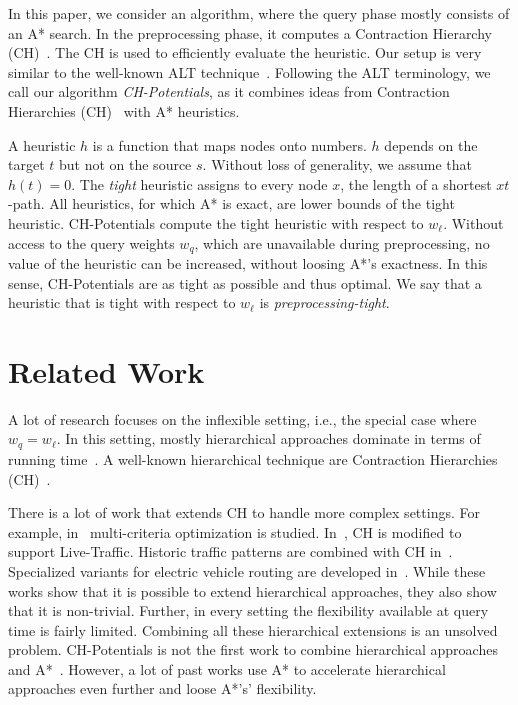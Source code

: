 \documentclass[a4paper,USenglish,cleveref, autoref, thm-restate]{lipics-v2019}
\begin{document}
In this paper, we consider an algorithm, where the query phase mostly consists of an A* search.
In the preprocessing phase, it computes a Contraction Hierarchy (CH)~\cite{gssv-erlrn-12}.
The CH is used to efficiently evaluate the heuristic.
Our setup is very similar to the well-known ALT technique~\cite{gh-cspas-05,DBLP:conf/wea/DellingW07}.
Following the ALT terminology, we call our algorithm \emph{CH-Potentials}, as it combines ideas from Contraction Hierarchies (CH)~\cite{gssv-erlrn-12} with A* heuristics.

A heuristic $h$ is a function that maps nodes onto numbers.
$h$ depends on the target $t$ but not on the source $s$.
Without loss of generality, we assume that $h(t)=0$.
The \emph{tight} heuristic assigns to every node $x$, the length of a shortest $xt$-path.
All heuristics, for which A* is exact, are lower bounds of the tight heuristic.
CH-Potentials compute the tight heuristic with respect to $w_\ell$.
Without access to the query weights $w_q$, which are unavailable during preprocessing, no value of the heuristic can be increased, without loosing A*'s exactness.
In this sense, CH-Potentials are as tight as possible and thus optimal.
We say that a heuristic that is tight with respect to $w_\ell$ is \emph{preprocessing-tight}.

\section{Related Work}

A lot of research focuses on the inflexible setting, i.e., the special case where $w_q = w_\ell$.
In this setting, mostly hierarchical approaches dominate in terms of running time~\cite{bdgmpsww-rptn-16}.
A well-known hierarchical technique are Contraction Hierarchies (CH)~\cite{gssv-erlrn-12}.

There is a lot of work that extends CH to handle more complex settings.
For example, in~\cite{fns-opca-14,gks-rpfof-10} multi-criteria optimization is studied.
In~\cite{dsw-cch-15}, CH is modified to support Live-Traffic.
Historic traffic patterns are combined with CH in~\cite{swz-sfert-19,bgsv-mtdtt-13,bdpw-dtdrp-16}.
Specialized variants for electric vehicle routing are developed in~\cite{DBLP:journals/algorithmica/BaumDPSWZ20,DBLP:conf/aaai/EisnerFS11}.
While these works show that it is possible to extend hierarchical approaches, they also show that it is non-trivial.
Further, in every setting the flexibility available at query time is fairly limited.
Combining all these hierarchical extensions is an unsolved problem.
%
CH-Potentials is not the first work to combine hierarchical approaches and A*~\cite{bdsssw-chgds-10,gkw-blwr-07,bdgwz-sfpcs-19}.
However, a lot of past works use A* to accelerate hierarchical approaches even further and loose A*'s' flexibility.
\end{document}
